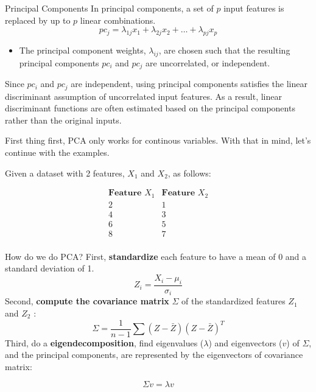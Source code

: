 \documentclass[10pt,dvipsnames]{beamer}
\begin{document}
\begin{frame}{Principal Components}
	In principal components, a set of \(p\) input features is replaced by up to \(p\) linear combinations.
	$$
		p c_{j}=\lambda_{1 j} x_{1}+\lambda_{2 j} x_{2}+\ldots+\lambda_{p j} x_{p}
	$$
	\begin{itemize}
		\item The principal component weights, \(\lambda_{i j}\), are chosen such that the resulting principal components \(p c_{i}\) and \(p c_{j}\) are uncorrelated, or
		      independent.
	\end{itemize}
	Since \(p c_{i}\) and \(p c_{j}\) are independent, using principal components satisfies the linear discriminant assumption of uncorrelated
	input features. As a result, linear discriminant functions are often estimated based on the principal components rather than the original
	inputs.
\end{frame}

\begin{frame}
	First thing first, PCA only works for continous variables. With that in mind, let's continue with the examples.

	Given a dataset with 2 features, \(X_1\) and \(X_2\), as follows:

	\[
		\begin{array}{cc}
			\textbf{Feature } X_1 & \textbf{Feature } X_2 \\
			2                     & 1                     \\
			4                     & 3                     \\
			6                     & 5                     \\
			8                     & 7                     \\
		\end{array}
	\]

\end{frame}

\begin{frame}{How do we do PCA?}
	First, \textbf{standardize} each feature to have a mean of 0 and a standard deviation of 1.
	$$
		Z_{i}=\frac{X_{i}-\mu_{i}}{\sigma_{i}}
	$$
	Second, \textbf{compute the covariance matrix} \(\Sigma\) of the standardized features \(Z_{1}\) and \(Z_{2}\) :
	$$
		\Sigma=\frac{1}{n-1} \sum(Z-\bar{Z})(Z-\bar{Z})^{T}
	$$
	Third, do a \textbf{eigendecomposition}, find eigenvalues (\(\lambda\)) and eigenvectors (\(v\)) of \(\Sigma\), and the principal components, are represented by the eigenvectors of covariance matrix:

	\[
		\Sigma v = \lambda v
	\]
\end{frame}
\end{document}
